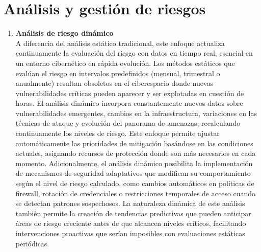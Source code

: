 \section{Análisis y gestión de riesgos}
\begin{enumerate}
\item \textbf{Análisis de riesgo dinámico} \\
A diferencia del análisis estático tradicional, este enfoque actualiza continuamente la evaluación del riesgo con datos en tiempo real, esencial en un entorno cibernético en rápida evolución. Los métodos estáticos que evalúan el riesgo en intervalos predefinidos (mensual, trimestral o anualmente) resultan obsoletos en el ciberespacio donde nuevas vulnerabilidades críticas pueden aparecer y ser explotadas en cuestión de horas. El análisis dinámico incorpora constantemente nuevos datos sobre vulnerabilidades emergentes, cambios en la infraestructura, variaciones en las técnicas de ataque y evolución del panorama de amenazas, recalculando continuamente los niveles de riesgo. Este enfoque permite ajustar automáticamente las prioridades de mitigación basándose en las condiciones actuales, asignando recursos de protección donde son más necesarios en cada momento. Adicionalmente, el análisis dinámico posibilita la implementación de mecanismos de seguridad adaptativos que modifican su comportamiento según el nivel de riesgo calculado, como cambios automáticos en políticas de firewall, rotación de credenciales o restricciones temporales de acceso cuando se detectan patrones sospechosos. La naturaleza dinámica de este análisis también permite la creación de tendencias predictivas que pueden anticipar áreas de riesgo creciente antes de que alcancen niveles críticos, facilitando intervenciones proactivas que serían imposibles con evaluaciones estáticas periódicas.


\end{enumerate}
